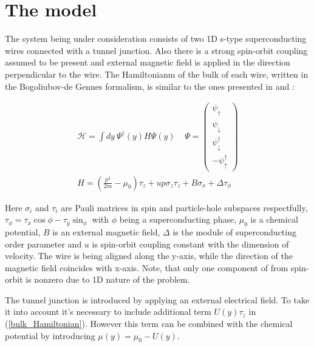 \newcommand{\xbr}{\left(x\right)}
\newcommand{\br}[1]{\left(#1\right)}

\chapter{The model}

The system being under consideration consists of two 1D s-type superconducting wires connected with a tunnel junction. Also  there is a strong spin-orbit coupling assumed to be present and external magnetic field is applied in the direction perpendicular to the wire. The Hamiltonianm of the bulk of each wire, written in the Bogoliubov-de Gennes formalism, is similar to the ones presented in \cite{Oreg_2010} and \cite{Lutchyn_2010}:

\begin{gather}
	\mathcal{H}
	=
	\int dy ~
	\Psi^\dagger
	\br{y}
	H
	\Psi
	\br{y}
	\
	~~~~
	\Psi
	=
	\begin{pmatrix}
		\psi_\uparrow
		\\
		\psi_\downarrow
		\\
		\psi_\downarrow^\dagger
		\\
		-\psi_\uparrow^\dagger
	\end{pmatrix}
	\\
	\label{bulk_Hamiltonian}
	H
	=
	\br{
		\frac{p^2}{2m}
		-\mu_0
	}\tau_z
	+
	u p \sigma_z \tau_z
	+
	B\sigma_x	
	+
	\Delta\tau_\phi
\end{gather}

Here $ \sigma_i $ and $ \tau_i $ are Pauli matrices in spin and particle-hole subspaces respectfully, $ \tau_\phi = \tau_x \cos\phi - \tau_y \sin_\phi$ with $ \phi $ being a superconducting phase, $ \mu_0 $ is a chemical potential, $ B $ is an external magnetic field, $ \Delta $ is the module of superconducting order parameter and $ u $ is spin-orbit coupling constant with the dimension of velocity. The wire is being aligned along the y-axis, while the direction of the magnetic field coincides with x-axis. Note, that only one component of from spin-orbit is nonzero due to 1D nature of the problem.

The tunnel junction is introduced  by applying an external electrical field. To take it into account it's necessary to include additional term  $ U \br{y}\tau_z $ in (\ref{bulk_Hamiltonian}). However this term can be combined with the chemical potential by introducing $ \mu \br{y} = \mu_0 - U\br{y} $.

